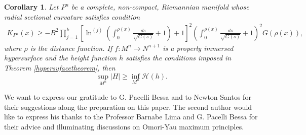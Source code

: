 \documentclass[a4paper]{amsart}
\newtheorem{corollary}{Corollary}
\begin{document}
\begin{corollary} Let $ P^n $ be a complete, non-compact, Riemannian manifold whose radial sectional curvature satisfies condition 
\begin{eqnarray*}
K_{P^n}(x) \geq - B^{2}\prod_{j=1}^{k}\left[\ln^{(j)}\left(\int_{0}^{\rho(x)}\frac{ds}{\sqrt{G(s)}} + 1\right)+1\right]^{2}\left(\int_{0}^{\rho(x)}\frac{ds}{\sqrt{G(s)}} + 1\right)^{2}G(\rho(x)),
\end{eqnarray*}
where $ \rho $ is the distance function. If $ f : M^{n} \to N^{n+1} $ is a properly immersed hypersurface and the height function $ h $ satisfies the conditions imposed in Theorem \ref{hypersufacetheorem}, then
\begin{equation}
\sup_{M^n}\vert H \vert \geq \inf_{M^n}\mathcal{H}(h).
\end{equation}
\end{corollary}

\vspace{.5cm}

 We want to express our gratitude to G. Pacelli Bessa and to Newton Santos for their suggestions along the preparation on this paper. The second author would like to express his thanks to the Professor Barnabe Lima and G. Pacelli Bessa for their
 advice and illuminating discussions on Omori-Yau maximum principles.
\end{document}
